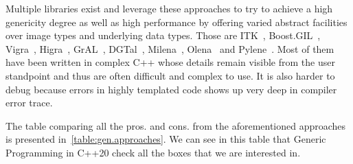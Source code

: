 Multiple libraries exist and leverage these approaches to try to achieve a high genericity degree as well as high
performance by offering varied abstract facilities over image types and underlying data types. Those are
ITK~\parencite{johnson.2013.ITKSoftwareGuideThirdEdition,yoo.2002.engineering}, Boost.GIL~\parencite{bourdev.2006.bgil},
Vigra~\parencite{kothe.2011.generic}, Higra~\parencite{perret.2019.higra}, GrAL~\parencite{berti.2006.gral},
DGTal~\parencite{coeurjolly.2016.dgtal},
Milena~\parencite{geraud.2012.ipolmeeting,levillain.2009.ismm,levillain.2010.icip},
Olena~\parencite{olena.2000.www,geraud.2000.europlop,levillain.2011.phd,geraud.2012.hdr,levillain.2014.ciarp} and
Pylene~\parencite{carlinet.2018.pylene}. Most of them have been written in complex C++ whose details remain visible from
the user standpoint and thus are often difficult and complex to use. It is also harder to debug because errors in highly
templated code shows up very deep in compiler error trace.

The table comparing all the pros. and cons. from the aforementioned approaches is presented
in~\cref{table:gen.approaches}. We can see in this table that Generic Programming in C++20 check all the boxes that we
are interested in.

